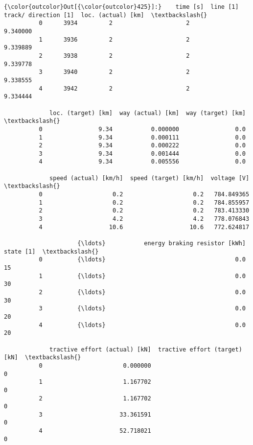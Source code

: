 \documentclass[11pt]{article}
\begin{document}
\begin{Verbatim}[commandchars=\\\{\}]
{\color{outcolor}Out[{\color{outcolor}425}]:}    time [s]  line [1]  track/ direction [1]  loc. (actual) [km]  \textbackslash{}
          0      3934         2                     2            9.340000   
          1      3936         2                     2            9.339889   
          2      3938         2                     2            9.339778   
          3      3940         2                     2            9.338555   
          4      3942         2                     2            9.334444   
          
             loc. (target) [km]  way (actual) [km]  way (target) [km]  \textbackslash{}
          0                9.34           0.000000                0.0   
          1                9.34           0.000111                0.0   
          2                9.34           0.000222                0.0   
          3                9.34           0.001444                0.0   
          4                9.34           0.005556                0.0   
          
             speed (actual) [km/h]  speed (target) [km/h]  voltage [V]  \textbackslash{}
          0                    0.2                    0.2   784.849365   
          1                    0.2                    0.2   784.855957   
          2                    0.2                    0.2   783.413330   
          3                    4.2                    4.2   778.076843   
          4                   10.6                   10.6   772.624817   
          
                     {\ldots}           energy braking resistor [kWh]  state [1]  \textbackslash{}
          0          {\ldots}                                     0.0         15   
          1          {\ldots}                                     0.0         30   
          2          {\ldots}                                     0.0         30   
          3          {\ldots}                                     0.0         20   
          4          {\ldots}                                     0.0         20   
          
             tractive effort (actual) [kN]  tractive effort (target) [kN]  \textbackslash{}
          0                       0.000000                              0   
          1                       1.167702                              0   
          2                       1.167702                              0   
          3                      33.361591                              0   
          4                      52.718021                              0   
          

\end{Verbatim}
\end{document}
